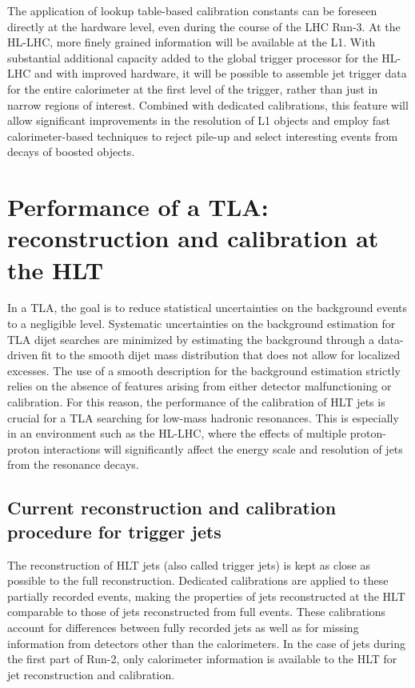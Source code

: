 \documentclass[a4paper,justified]{tufte-handout}
\begin{document}
The application of lookup table-based calibration constants can be foreseen directly at the hardware level, even during the course of the LHC Run-3. At the HL-LHC, more finely grained information will be available at the L1. With substantial additional capacity added to the global trigger processor for the HL-LHC and with improved hardware, it will be possible to assemble jet trigger data for the entire calorimeter at the first level of the trigger, rather than just in narrow regions of interest. Combined with dedicated calibrations, this feature will allow significant improvements in the resolution of L1 objects and employ fast calorimeter-based techniques to reject pile-up and select interesting events from decays of boosted objects. 
\section{Performance of a TLA: reconstruction and calibration at the HLT} \label{sec:HLTPerformance}

In a TLA, the goal is to reduce statistical uncertainties on the background events to a negligible level. Systematic uncertainties on the background estimation for TLA dijet searches are minimized by estimating the background through a data-driven fit to the smooth dijet mass distribution that does not allow for localized excesses. The use of a smooth description for the background estimation strictly relies on the absence of features arising from either detector malfunctioning or calibration. For this reason, the performance of the calibration of HLT jets is crucial for a TLA searching for low-mass hadronic resonances. This is especially in an environment such as the HL-LHC, where the effects of multiple proton-proton interactions will significantly affect the energy scale and resolution of jets from the resonance decays. 

\subsection{Current reconstruction and calibration procedure for trigger jets}
\label{subsec:L1Limitations}


The reconstruction of HLT jets (also called trigger jets) is kept as close as possible to the full reconstruction. Dedicated calibrations are applied to these partially recorded events, making the properties of jets reconstructed at the HLT comparable to those of jets reconstructed from full events. These calibrations account for differences between fully recorded jets as well as for missing information from detectors other than the calorimeters. In the case of jets during the first part of Run-2, only calorimeter information is available to the HLT for jet reconstruction and calibration. 
\end{document}
